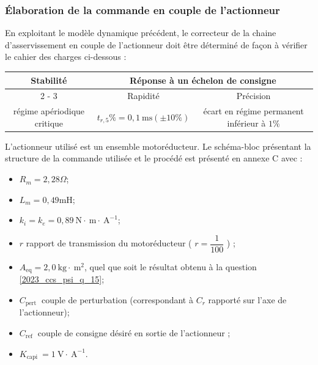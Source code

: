 \subsubsection{Élaboration de la commande en couple de l'actionneur}
En exploitant le modèle dynamique précédent, le correcteur de la chaine d'asservissement en couple de l'actionneur doit être déterminé de façon à vérifier le cahier des charges ci-dessous :

\begin{center}
\begin{tabular}{|c|c|c|}
\hline
\multirow{2}{*}{Stabilité} & \multicolumn{2}{|c|}{Réponse à un échelon de consigne} \\
\cline { 2 - 3 }
 & Rapidité & Précision \\
\hline
régime apériodique critique & $t_{r, 5} \%=0,1 \mathrm{~ms}( \pm 10 \%)$ & écart en régime permanent inférieur à $1 \%$ \\
\hline
\end{tabular}
\end{center}

L'actionneur utilisé est un ensemble motoréducteur. Le schéma-bloc présentant la structure de la commande utilisée et le procédé est présenté en annexe C avec :

\begin{itemize}
  \item $R_{m}=2,28 \Omega$;
  \item $L_{m}=0,49 \mathrm{mH}$;
  \item $k_{i}=k_{e}=0,89 \mathrm{~N} \cdot \mathrm{~m} \cdot \mathrm{~A}^{-1}$;
  \item $r$ rapport de transmission du motoréducteur ( $r=\dfrac{1}{100}$ ) ;
  \item $A_{\mathrm{eq}}=2,0 \mathrm{~kg} \cdot \mathrm{~m}^{2}$, quel que soit le résultat obtenu à la question \ref{2023_ccs_psi_q_15};
  \item $C_{\text {pert }}$ couple de perturbation (correspondant à $C_{r}$ rapporté sur l'axe de l'actionneur);
  \item $C_{\text {ref }}$ couple de consigne désiré en sortie de l'actionneur ;
  \item $K_{\text {capi }}=1 \mathrm{~V} \cdot \mathrm{~A}^{-1}$.
\end{itemize}

